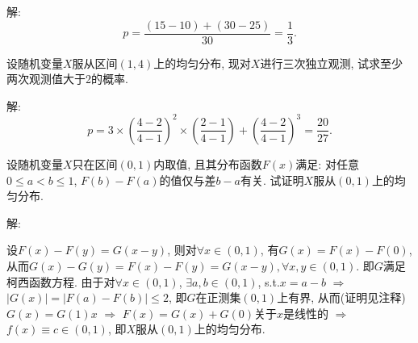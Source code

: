\documentclass[standard]{ExBook}
\begin{document}
\begin{qitems}
\vspace{-5em}

    \begin{bbox}
解: 
$$p=\displaystyle\frac{(15-10)+(30-25)}{30}=\frac{1}{3}.$$
    \end{bbox}

\vspace{-5em}

    \begin{bbox}
    \begin{shaded}
        \qitem
设随机变量$X$服从区间$(1,4)$上的均匀分布, 现对$X$进行三次独立观测, 试求至少两次观测值大于2的概率.
    \end{shaded}
    \end{bbox}

\vspace{-5em}

    \begin{bbox}
解: 
$$p=\displaystyle3\times\left(\frac{4-2}{4-1}\right)^{2}\times\left(\frac{2-1}{4-1}\right)+\left(\frac{4-2}{4-1}\right)^{3}=\frac{20}{27}.$$
    \end{bbox}

\vspace{-5em}

    \begin{bbox}
    \begin{shaded}
        \qitem
设随机变量$X$只在区间$(0,1)$内取值, 且其分布函数$F(x)$满足: 对任意$0 \leq a < b \leq 1$, $F(b) - F(a)$的值仅与差$b-a$有关. 试证明$X$服从$(0,1)$上的均匀分布.
    \end{shaded}
    \end{bbox}

\vspace{-5em}

    \begin{bbox}
解: 

设$F(x)-F(y)=G(x-y)$, 则对$\forall x\in(0,1)$, 有$G(x)=F(x)-F(0)$, 从而$G(x)-G(y)=F(x)-F(y)=G(x-y),\forall x,y\in(0,1)$. 即$G$满足柯西函数方程. 由于对$\forall x\in(0,1)$, $\exists a,b\in(0,1)$, s.t.$x=a-b$ $\Longrightarrow$ $|G(x)|=|F(a)-F(b)| \leq 2$, 即$G$在正测集$(0,1)$上有界, 从而(证明见注释)$G(x)=G(1)x$ $\Longrightarrow$ $F(x)=G(x)+G(0)$关于$x$是线性的 $\Longrightarrow$ $f(x)\equiv c\in(0,1)$, 即$X$服从$(0,1)$上的均匀分布.


\end{bbox}
\end{qitems}
\end{document}
